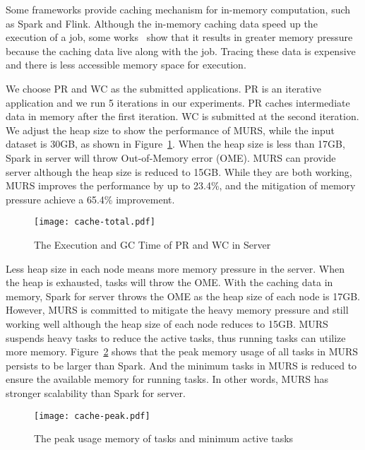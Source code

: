 Some frameworks provide caching mechanism for in-memory computation, such as Spark and Flink. Although the in-memory caching data speed up the execution of a job, some works~\cite{bu:bloat, nguyen2015facade} show that it results in greater memory pressure because the caching data live along with the job. Tracing these data is expensive and there is less accessible memory space for execution.

We choose PR and WC as the submitted applications. PR is an iterative application and we run 5 iterations in our experiments. PR caches intermediate data in memory after the first iteration. WC is submitted at the second iteration. We adjust the heap size to show the performance of MURS, while the input dataset is 30GB, as shown in Figure~\ref{fig:cache-total}. When the heap size is less than 17GB, Spark in server will throw Out-of-Memory error (OME). MURS can provide server although the heap size is reduced to 15GB. While they are both working, MURS improves the performance by up to 23.4\%, and the mitigation of memory pressure achieve a 65.4\% improvement.

\begin{figure}[!t]
\centering
\texttt{[image: cache-total.pdf]}
\caption{The Execution and GC Time of PR and WC in Server}
\label{fig:cache-total}
\end{figure}

Less heap size in each node means more memory pressure in the server. When the heap is exhausted, tasks will throw the OME. With the caching data in memory, Spark for server throws the OME as the heap size of each node is 17GB. However, MURS is committed to mitigate the heavy memory pressure and still working well although the heap size of each node reduces to 15GB. MURS suspends heavy tasks to reduce the active tasks, thus running tasks can utilize more memory. Figure~\ref{fig:cache-peak} shows that the peak memory usage of all tasks in MURS persists to be larger than Spark. And the minimum tasks in MURS is reduced to ensure the available memory for running tasks. In other words, MURS has stronger scalability than Spark for server.

\begin{figure}[!t]
\centering
\texttt{[image: cache-peak.pdf]}
\caption{The peak usage memory of tasks and minimum active tasks}
\label{fig:cache-peak}
\end{figure}


